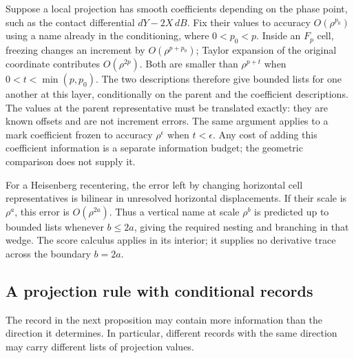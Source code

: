 \begin{remark}
\label{names:score-coefficients}
Suppose a local projection has smooth coefficients depending on the
phase point, such as the contact differential $dY-2X\,dB$.  Fix their
values to accuracy $O(\rho^{p_0})$ using a name already in the
conditioning, where $0<p_0<p$.  Inside an $F_p$ cell, freezing changes
an increment by $O(\rho^{p+p_0})$; Taylor expansion of the original
coordinate contributes $O(\rho^{2p})$.  Both are smaller than
$\rho^{p+t}$ when $0<t<\min(p,p_0)$.  The two descriptions therefore
give bounded lists for one another at this layer, conditionally on the
parent and the coefficient descriptions.  The values at the parent
representative must be translated exactly: they are known offsets and
are not increment errors.  The same argument applies to a mark
coefficient frozen to accuracy $\rho^\epsilon$ when $t<\epsilon$.
Any cost of adding this coefficient information is a separate
information budget; the geometric comparison does not supply it.

For a Heisenberg recentering, the error left by changing horizontal
cell representatives is bilinear in unresolved horizontal
displacements.  If their scale is $\rho^a$, this error is
$O(\rho^{2a})$.  Thus a vertical name at scale $\rho^b$ is predicted
up to bounded lists whenever $b\le2a$, giving the required nesting and
branching in that wedge.  The score calculus applies in its interior;
it supplies no derivative trace across the boundary $b=2a$.
\end{remark}

\subsection{A projection rule with conditional records}
\label{names:score-projections}

The record in the next proposition may contain more information than
the direction it determines.  In particular, different records with
the same direction may carry different lists of projection values.

